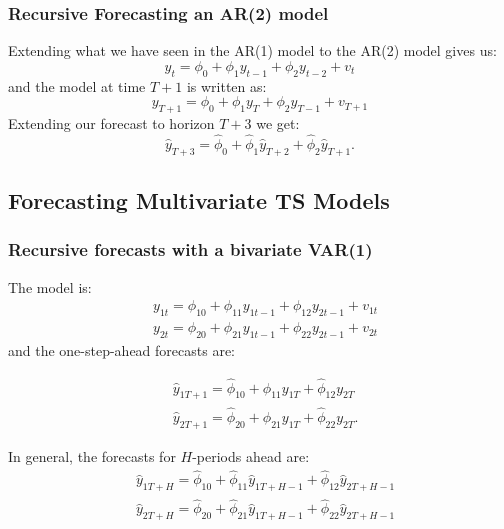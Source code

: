 \documentclass[11pt]{article}
\begin{document}
\subsubsection{Recursive Forecasting an AR(2) model}

Extending what we have seen in the AR(1) model to the AR(2) model gives us:
\begin{equation}
y_t=\phi_0+\phi_1 y_{t-1}+\phi_2 y_{t-2}+v_t
\end{equation}
and the model at time $T+1$ is written as:
\begin{equation}
y_{T+1}=\phi_0+\phi_1 y_T+\phi_2 y_{T-1}+v_{T+1}
\end{equation}
Extending our forecast to horizon $T+3$ we get:
\begin{equation}
\widehat{y}_{T+3}=\widehat{\phi}_0+\widehat{\phi}_1 \widehat{y}_{T+2}+\widehat{\phi}_2 \widehat{y}_{T+1} .
\end{equation}

\subsection{Forecasting Multivariate TS Models}
\subsubsection{Recursive forecasts with a bivariate VAR(1)}

The model is:
\begin{equation}
\begin{aligned}
& y_{1 t}=\phi_{10}+\phi_{11} y_{1 t-1}+\phi_{12} y_{2 t-1}+v_{1 t} \\
& y_{2 t}=\phi_{20}+\phi_{21} y_{1 t-1}+\phi_{22} y_{2 t-1}+v_{2 t}
\end{aligned}
\end{equation}
and the one-step-ahead forecasts are:

\begin{equation}
\begin{aligned}
& \widehat{y}_{1 T+1}=\widehat{\phi}_{10}+\widehat{\phi}_{11} y_{1 T}+\widehat{\phi}_{12} y_{2 T} \\
& \widehat{y}_{2 T+1}=\widehat{\phi}_{20}+\widehat{\phi}_{21} y_{1 T}+\widehat{\phi}_{22} y_{2 T} .
\end{aligned}
\end{equation}

In general, the forecasts for $H$-periods ahead are:
\begin{equation}
\begin{aligned}
& \widehat{y}_{1 T+H}=\widehat{\phi}_{10}+\widehat{\phi}_{11} \widehat{y}_{1 T+H-1}+\widehat{\phi}_{12} \widehat{y}_{2 T+H-1} \\
& \widehat{y}_{2 T+H}=\widehat{\phi}_{20}+\widehat{\phi}_{21} \widehat{y}_{1 T+H-1}+\widehat{\phi}_{22} \widehat{y}_{2 T+H-1}
\end{aligned}
\end{equation}
\end{document}
